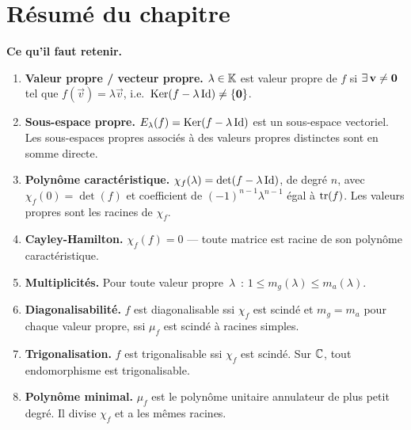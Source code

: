 \section*{Résumé du chapitre}

\begin{framed}
\textbf{Ce qu'il faut retenir.}

\begin{enumerate}[label=\textbf{\arabic*.},leftmargin=2em]
  \item \textbf{Valeur propre / vecteur propre.} $\lambda\in{\mathbb{K}}$ est
    valeur propre de $f$ si $\exists\,\mathbf{v}\neq\mathbf{0}$ tel que
    $f(\vec{v})=\lambda\vec{v}$, i.e.\
    $\operatorname{Ker}(f-\lambda\operatorname{Id})\neq\left\{\mathbf{0}\right\}$.

  \item \textbf{Sous-espace propre.}
    $E_\lambda(f)=\operatorname{Ker}(f-\lambda\operatorname{Id})$ est un sous-espace vectoriel.
    Les sous-espaces propres associés à des valeurs propres distinctes
    sont en somme directe.

  \item \textbf{Polynôme caractéristique.}
    $\chi_f(\lambda)=\det(f-\lambda\operatorname{Id})$, de degré $n$, avec
    $\chi_f(0)=\det(f)$ et coefficient de $(-1)^{n-1}\lambda^{n-1}$
    égal à $\operatorname{tr}(f)$. Les valeurs propres sont les racines de $\chi_f$.

  \item \textbf{Cayley-Hamilton.} $\chi_f(f)=0$ --- toute matrice est
    racine de son polynôme caractéristique.

  \item \textbf{Multiplicités.} Pour toute valeur propre~$\lambda$~:
    $1\leq m_g(\lambda)\leq m_a(\lambda)$.

  \item \textbf{Diagonalisabilité.} $f$ est diagonalisable ssi $\chi_f$
    est scindé et $m_g=m_a$ pour chaque valeur propre, ssi $\mu_f$ est
    scindé à racines simples.

  \item \textbf{Trigonalisation.} $f$ est trigonalisable ssi $\chi_f$
    est scindé. Sur ${\mathbb{C}}$, tout endomorphisme est trigonalisable.

  \item \textbf{Polynôme minimal.} $\mu_f$ est le polynôme unitaire
    annulateur de plus petit degré. Il divise $\chi_f$ et a les mêmes
    racines.


\end{enumerate}
\end{framed}
